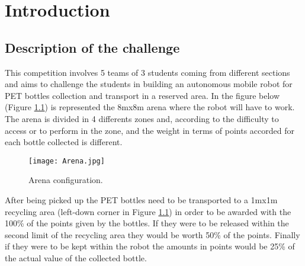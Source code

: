 %
%   
%

\chapter{Introduction}

\section{Description of the challenge}
This competition involves 5 teams of 3 students coming from different sections and aims to challenge the students in building  an autonomous mobile robot for PET bottles collection and transport in a reserved area.
In the figure below (Figure \ref{fig:Arena}) is represented the 8mx8m arena where the robot will have to work.
The arena is divided in 4 differents zones and, according to the difficulty to access or to perform in the zone, and the weight in terms of points accorded for each bottle collected is different.

\begin{figure}[H]
  \centering
  \texttt{[image: Arena.jpg]}
  \caption{Arena configuration.}
\label{fig:Arena}
\end{figure}

After being picked up the PET bottles need to be transported to a 1mx1m recycling area (left-down corner in Figure \ref{fig:Arena}) in order to be awarded with the 100\% of the points given by the bottles.
If they were to be released within the second limit of the recycling area they would be worth 50\% of the points. Finally if they were to be kept within the robot the amounts in points would be 25\% of the actual value of the collected bottle. 



